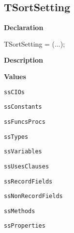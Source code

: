 \documentclass{report}
\newif\ifpdf
\begin{document}
\subsection*{TSortSetting}
\fi
\label{PasDoc_SortSettings-TSortSetting}
\begin{list}{}{
\setlength{\itemindent}{0cm}
\setlength{\listparindent}{0cm}
\setlength{\leftmargin}{\evensidemargin}
\addtolength{\leftmargin}{\tmplength}
\settowidth{\labelsep}{X}
\addtolength{\leftmargin}{\labelsep}
\setlength{\labelwidth}{\tmplength}
}
\item[\textbf{Declaration}\hfill]
\ifpdf
\begin{flushleft}
\fi
\begin{ttfamily}
TSortSetting = (...);\end{ttfamily}

\ifpdf
\end{flushleft}
\fi

\par
\item[\textbf{Description}]
 \item[\textbf{Values}]
\begin{description}
\item[\texttt{ssCIOs}] \label{PasDoc_SortSettings-ssCIOs}
\index{}
 
\item[\texttt{ssConstants}] \label{PasDoc_SortSettings-ssConstants}
\index{}
 
\item[\texttt{ssFuncsProcs}] \label{PasDoc_SortSettings-ssFuncsProcs}
\index{}
 
\item[\texttt{ssTypes}] \label{PasDoc_SortSettings-ssTypes}
\index{}
 
\item[\texttt{ssVariables}] \label{PasDoc_SortSettings-ssVariables}
\index{}
 
\item[\texttt{ssUsesClauses}] \label{PasDoc_SortSettings-ssUsesClauses}
\index{}
 
\item[\texttt{ssRecordFields}] \label{PasDoc_SortSettings-ssRecordFields}
\index{}
 
\item[\texttt{ssNonRecordFields}] \label{PasDoc_SortSettings-ssNonRecordFields}
\index{}
 
\item[\texttt{ssMethods}] \label{PasDoc_SortSettings-ssMethods}
\index{}
 
\item[\texttt{ssProperties}] \label{PasDoc_SortSettings-ssProperties}
\index{}
 
\end{description}


\end{list}
\ifpdf
\end{document}
